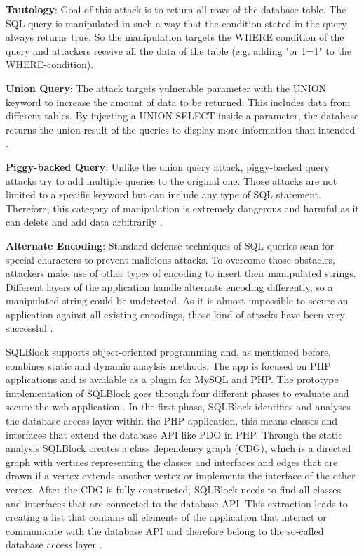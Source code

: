 \textbf{Tautology}: Goal of this attack is to return all rows of the database table. The SQL query is manipulated in such a way that the condition stated in the query always returns true. So the manipulation targets the WHERE condition of the query and attackers receive all the data of the table (e.g. adding "or 1=1" to the WHERE-condition)\autocite[3]{Halfond2008}.\newline


\textbf{Union Query}: The attack targets vulnerable parameter with the UNION keyword to increase the amount of data to be returned. This includes data from different tables. By injecting a UNION SELECT inside a parameter, the database returns the union result of the queries to display more information than intended \autocite[4]{Halfond2008}.\newline


\textbf{Piggy-backed Query}: Unlike the union query attack, piggy-backed query attacks try to add multiple queries to the original one. Those attacks are not limited to a specific keyword but can include any type of SQL statement. Therefore, this category of manipulation is extremely dangerous and harmful as it can delete and add data arbitrarily \autocite[4]{Halfond2008}.\newline


\textbf{Alternate Encoding}: Standard defense techniques of SQL queries scan for special characters to prevent malicious attacks. To overcome those obstacles, attackers make use of other types of encoding to insert their manipulated strings. Different layers of the application handle alternate encoding differently, so a manipulated string could be undetected. As it is almost impossible to secure an application against all existing encodings, those kind of attacks have been very successful \autocite[5]{Halfond2008}.\newline

SQLBlock supports object-oriented programming and, as mentioned before, combines static and dynamic anaylsis methods. The app is focused on PHP applications and is available as a plugin for MySQL and PHP. The prototype implementation of SQLBlock goes through four different phases to evaluate and secure the web application \autocite[1, 5]{Jahanshahi2018}.\newline
In the first phase, SQLBlock identifies and analyses the database access layer within the PHP application, this means classes and interfaces that extend the database API like PDO in PHP. Through the static analysis SQLBlock creates a class dependency graph (CDG), which is a directed graph with vertices representing the classes and interfaces and edges that are drawn if a vertex extends another vertex or implements the interface of the other vertex. After the CDG is fully constructed, SQLBlock needs to find all classes and interfaces that are connected to the database API. This extraction leads to creating a list that contains all elements of the application that interact or communicate with the database API and therefore belong to the so-called database access layer \autocite[3, 6]{Jahanshahi2018}.\newline


